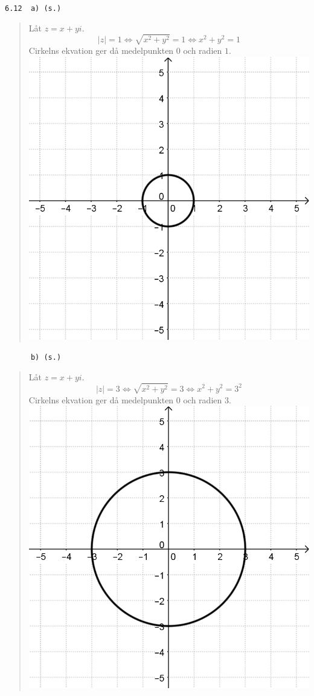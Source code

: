 \documentclass[a4paper]{article}
\newcommand{\tskcol}[1]{\textcolor{tskcol}{#1}}
\begin{document}
	\texttt{\tskcol{6.12~~a) (s.)}}
	\begin{quotation}
		\noindent
		Låt $z=x+yi$.
		\[|z|=1 \Leftrightarrow
		\sqrt{x^2+y^2}=1 \Leftrightarrow
		x^2+y^2=1\]
		Cirkelns ekvation ger då medelpunkten $0$ och radien $1$. \\
		\includegraphics[scale=0.2]{images/612a.PNG}
	\end{quotation}
	
	\pagebreak
	\texttt{\tskcol{~~~~~~b) (s.)}}
	\begin{quotation}
		\noindent
		Låt $z=x+yi$.
		\[|z|=3 \Leftrightarrow
		\sqrt{x^2+y^2}=3 \Leftrightarrow
		x^2+y^2=3^2\]
		Cirkelns ekvation ger då medelpunkten $0$ och radien $3$. \\
		\includegraphics[scale=0.2]{images/612b.PNG}
	\end{quotation}
	
\end{document}
